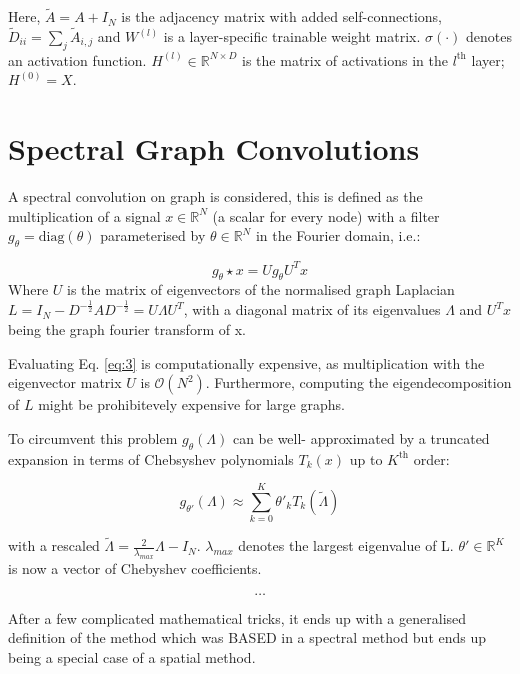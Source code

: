 \documentclass{article}
\begin{document}
Here, $\tilde{A} = A + I_N$ is the adjacency matrix with added
self-connections, $\tilde{D}_{ii} = \sum_j \tilde{A}_{i,j}$ and $W^{(l)}$ is a
layer-specific trainable weight matrix. $\sigma(\cdot)$ denotes an activation
function. $H^{(l)} \in \mathbb{R}^{N \times D}$ is the matrix of activations in
the $l^{\text{th}}$ layer; $H^{(0)} = X$.

\section{Spectral Graph Convolutions}
A spectral convolution on graph is considered, this is defined as the
multiplication of a signal $x \in \mathbb{R}^N$ (a scalar for every node) with
a filter $g_\theta = \text{diag}(\theta)$ parameterised by $\theta \in
\mathbb{R}^N$ in the Fourier domain, i.e.:

\begin{equation}
  g_{\theta} \star x = U g_\theta U^Tx
  \label{eq:3}
\end{equation}
Where $U$ is the matrix of eigenvectors of the normalised graph Laplacian $L =
I_N - D^{-\frac{1}{2}}A D^{-\frac{1}{2}} = U\Lambda U^T$, with a diagonal
matrix of its eigenvalues $\Lambda$ and $U^Tx$ being the graph fourier
transform of x.

Evaluating Eq. \ref{eq:3} is computationally expensive, as multiplication with
the eigenvector matrix $U$ is $\mathcal{O}(N^2)$. Furthermore, computing the
eigendecomposition of $L$ might be prohibitevely expensive for large graphs.

To circumvent this problem $g_\theta (\Lambda)$ can be well- approximated by a
truncated expansion in terms of Chebsyshev polynomials $T_k(x)$ up to
$K^{\text{th}}$ order:

\begin{equation}
  g_{\theta'} (\Lambda) \approx \sum_{k=0}^K \theta'_k T_k (\tilde{\Lambda})
  \label{eq:4}
\end{equation}

with a rescaled $\tilde{\Lambda} = \frac{2}{\lambda_{max}} \Lambda - I_N$.
$\lambda_{max}$ denotes the largest eigenvalue of L. $\theta' \in \mathbb{R}^K$
is now a vector of Chebyshev coefficients. 

\begin{equation}
  \ldots
\end{equation}

After a few complicated mathematical tricks, it ends up with a generalised definition of the method
which was BASED in a spectral method but ends up being a special case of a
spatial method.
\end{document}
